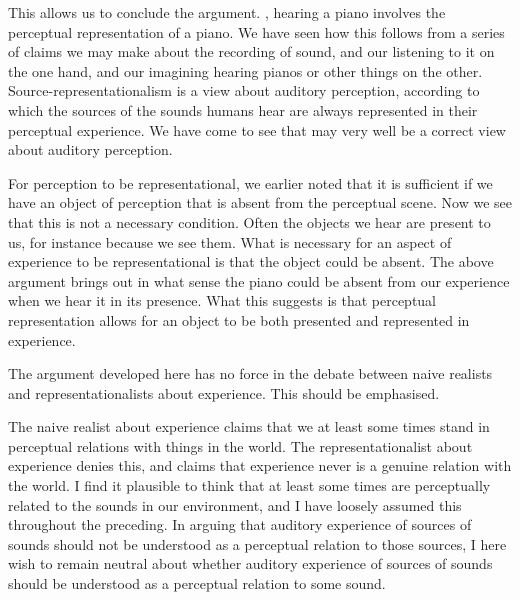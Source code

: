 \documentclass[sloppy, journal, git, bytitle, dodraft]{humapap}
\begin{document}
\sect This allows us to conclude the argument. %
, hearing a piano involves the perceptual representation of a piano. We have seen how this follows from a series of claims we may make about the recording of sound, and our listening to it on the one hand, and our imagining hearing pianos or other things on the other. Source-representationalism is a view about auditory perception, according to which the sources of the sounds humans hear are always represented in their perceptual experience. We have come to see that may very well be a correct view about auditory perception.

For perception to be representational, we earlier noted that it is sufficient if we have an object of perception that is absent from the perceptual scene. Now we see that this is not a necessary condition. Often the objects we hear are present to us, for instance because we see them. What is necessary for an aspect of experience to be representational is that the object could be absent. The above argument brings out in what sense the piano could be absent from our experience when we hear it in its presence. What this suggests is that perceptual representation allows for an object to be both presented and represented in experience. 

The argument developed here has no force in the debate between naive realists and representationalists about experience. This should be emphasised. 

The naive realist about experience claims that we at least some times stand in perceptual relations with things in the world. The representationalist about experience denies this, and claims that experience never is a genuine relation with the world. I find it plausible to think that at least some times are perceptually related to the sounds in our environment, and I have loosely assumed this throughout the preceding. In arguing that auditory experience of sources of sounds should not be understood as a perceptual relation to those sources, I here wish to remain neutral about whether auditory experience of sources of sounds should be understood as a perceptual relation to some sound. 
\end{document}
